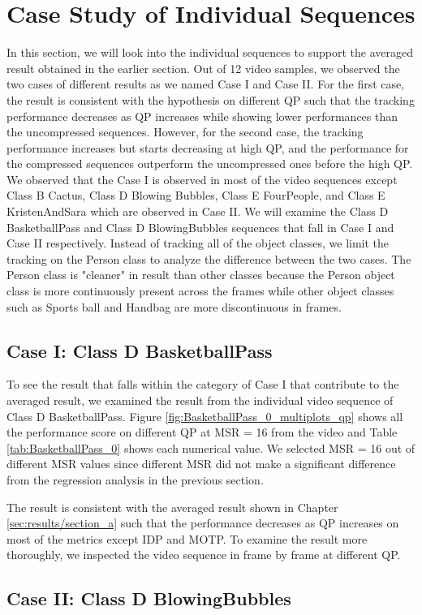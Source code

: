\section{Case Study of Individual Sequences}
\label{sec:results/section_b}

In this section, we will look into the individual sequences to support the averaged result obtained in the earlier section. Out of 12 video samples, we observed the two cases of different results as we named Case I and Case II. For the first case, the result is consistent with the hypothesis on different QP such that the tracking performance decreases as QP increases while showing lower performances than the uncompressed sequences. However, for the second case, the tracking performance increases but starts decreasing at high QP, and the performance for the compressed sequences outperform the uncompressed ones before the high QP. We observed that the Case I is observed in most of the video sequences except Class B Cactus, Class D Blowing Bubbles, Class E FourPeople, and Class E KristenAndSara which are observed in Case II. We will examine the Class D BasketballPass and Class D BlowingBubbles sequences that fall in Case I and Case II respectively. Instead of tracking all of the object classes, we limit the tracking on the Person class to analyze the difference between the two cases. The Person class is "cleaner" in result than other classes because the Person object class is more continuously present across the frames while other object classes such as Sports ball and Handbag are more discontinuous in frames.


\subsection{Case I: Class D BasketballPass}
To see the result that falls within the category of Case I that contribute to the averaged result, we examined the result from the individual video sequence of Class D BasketballPass. Figure \ref{fig:BasketballPass_0_multiplots_qp} shows all the performance score on different QP at MSR = 16 from the video and Table \ref{tab:BasketballPass_0} shows each numerical value. We selected MSR = 16 out of different MSR values since different MSR did not make a significant difference from the regression analysis in the previous section.


The result is consistent with the averaged result shown in Chapter \ref{sec:results/section_a} such that the performance decreases as QP increases on most of the metrics except IDP and MOTP. To examine the result more thoroughly, we inspected the video sequence in frame by frame at different QP. 


\subsection{Case II: Class D BlowingBubbles}
